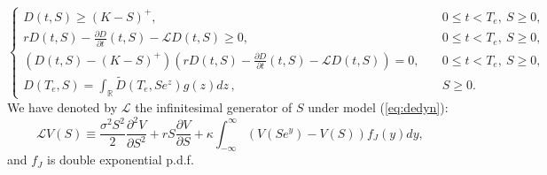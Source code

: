 \documentclass[11pt]{article}
\numberwithin{equation}{section}
\numberwithin{theorem}{section}
\begin{document}
\begin{equation}
\begin{cases}
D\left(t,S\right)\geq\left(K-S\right)^{+}, & \quad  0 \le  t <T_{e} ,\ S\geq0,\\
rD\left(t,S\right)-\frac{\partial{D}}{\partial t}\left(t,S\right)-\mathcal{L}D\left(t,S\right)\geq0, & \quad  0 \le  t <T_{e} ,\ S\geq0,\\
\left(D\left(t,S\right)-\left(K-S\right)^{+}\right)\left(rD\left(t,S\right)-\frac{\partial{D}}{\partial t}\left(t,S\right)-\mathcal{L}D\left(t,S\right)\right)=0, & \quad  0 \le  t <T_{e} ,\ S\geq0,\\
D\left(T_{e},S\right)=\int_{\mathbb{R}} \widetilde{D}\left(T_{e},Se^{z}\right)g\left(z\right)dz\,, & \quad S\geq0.
\end{cases}\label{eq:am_eq_2}
\end{equation}
We have denoted by $\mathcal{L}$ the  infinitesimal generator of $S$ under model (\ref{eq:dedyn}):
\begin{equation}
\mathcal{L}V(S)\equiv \frac{\sigma^2 S^2}{2} \frac{\partial^2 V}{\partial {S^2}} + rS\frac{\partial V}{\partial S} + \kappa \int_{-\infty}^{\infty}\left(V(Se^y)-V(S)\right)f_J(y)dy,
\label{eq:Kou_generator}
\end{equation}and $f_J$ is double exponential p.d.f. 
\end{document}

